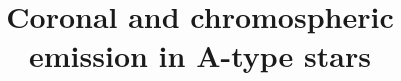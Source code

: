 \documentclass[linenumbers]{aastex631}
\begin{document}
\title{Coronal and chromospheric emission in A-type stars}


\end{document}
